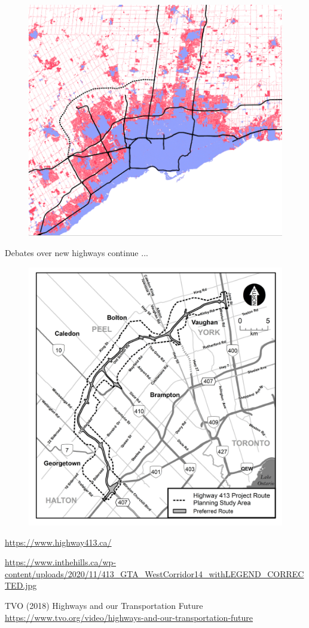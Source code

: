 \documentclass[aspectratio=169]{beamer}
\begin{document}
	
	
\begin{frame}
	
	\begin{figure}
		\centering
		\includegraphics[width=0.7\linewidth]{images/highways_dev_toronto.png}
	\end{figure}
	
\end{frame}
	



\begin{frame}
	
	Debates over new highways continue ...
	
	\begin{figure}
		\centering
		\includegraphics[width=0.45\linewidth]{images/highway413.jpg}
		
	\end{figure}
	\tiny{\url{https://www.highway413.ca/}}
	
	\vspace{1mm}
	
	 \url{https://www.inthehills.ca/wp-content/uploads/2020/11/413_GTA_WestCorridor14_withLEGEND_CORRECTED.jpg}
	\vspace{1mm}
	
	\tiny{TVO (2018) Highways and our Transportation Future \url{https://www.tvo.org/video/highways-and-our-transportation-future}} 
	
\end{frame}
	
\end{document}

